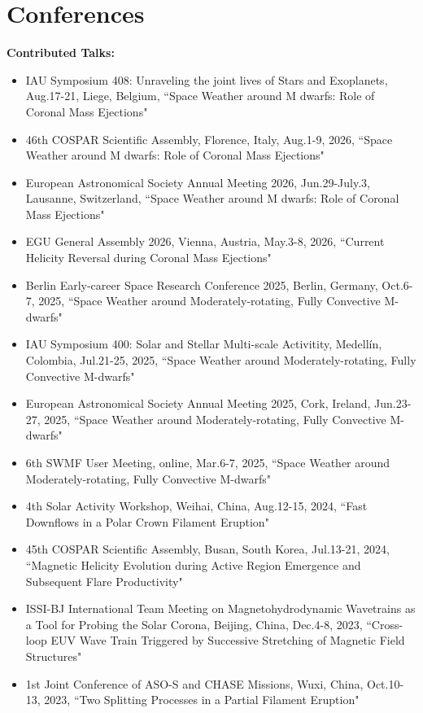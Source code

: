 \documentclass{resume}
\begin{document}
\section{Conferences}
\textbf{Contributed Talks:}
\begin{itemize}
\item IAU Symposium 408: Unraveling the joint lives of Stars and Exoplanets, Aug.17-21, Liege, Belgium, ``Space Weather around M dwarfs: Role of Coronal Mass Ejections"
\item 46th COSPAR Scientific Assembly, Florence, Italy, Aug.1-9, 2026, ``Space Weather around M dwarfs: Role of Coronal Mass Ejections"
\item European Astronomical Society Annual Meeting 2026, Jun.29-July.3, Lausanne, Switzerland, ``Space Weather around M dwarfs: Role of Coronal Mass Ejections"
\item EGU General Assembly 2026, Vienna, Austria, May.3-8, 2026, ``Current Helicity Reversal during Coronal Mass Ejections"
\item Berlin Early-career Space Research Conference 2025, Berlin, Germany, Oct.6-7, 2025, ``Space Weather around Moderately-rotating, Fully Convective M-dwarfs"
\item IAU Symposium 400: Solar and Stellar Multi-scale Activitity, Medellín, Colombia, Jul.21-25, 2025, ``Space Weather around Moderately-rotating, Fully Convective M-dwarfs"
\item European Astronomical Society Annual Meeting 2025, Cork, Ireland, Jun.23-27, 2025, ``Space Weather around Moderately-rotating, Fully Convective M-dwarfs"
\item 6th SWMF User Meeting, online, Mar.6-7, 2025, ``Space Weather around Moderately-rotating, Fully Convective M-dwarfs"
\item 4th Solar Activity Workshop, Weihai, China, Aug.12-15, 2024, ``Fast Downflows in a Polar Crown Filament Eruption"
\item 45th COSPAR Scientific Assembly, Busan, South Korea, Jul.13-21, 2024, ``Magnetic Helicity Evolution during Active Region Emergence and Subsequent Flare Productivity" 
\item ISSI-BJ International Team Meeting on Magnetohydrodynamic Wavetrains as a Tool for Probing the Solar Corona, Beijing, China, Dec.4-8, 2023, ``Cross-loop EUV Wave Train Triggered by Successive Stretching of Magnetic Field Structures" 
\item 1st Joint Conference of ASO-S and CHASE Missions, Wuxi, China, Oct.10-13, 2023, ``Two Splitting Processes in a Partial Filament Eruption"  

\end{itemize}
\end{document}
